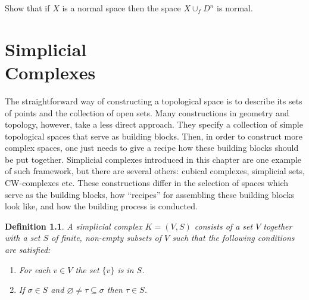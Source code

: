 \documentclass[11pt, letterpaper, oneside]{report}
\renewcommand{\chaptermark}[1]{\markboth{#1}{}}
\theoremstyle{pplain}
\newtheorem{ITERMVALUE THM}[theorem]{Intermediate Value Theorem}
\newtheorem{HEINEBOREL THM}[theorem]{Heine-Borel Theorem}
\newtheorem{UMETR THM}[theorem]{Urysohn Metrization Theorem}
\newtheorem{UMETR2 THM}[theorem]{Urysohn Metrization Theorem (v.2)}
\theoremstyle{ddefinition}
\newtheorem{definition}[theorem]{Definition}
\theoremstyle{nnn}
\newtheorem{TDA NN}[theorem]{Topological Data Analysis. }
\theoremstyle{eexercise}
\newcommand{\benu}{\begin{enumerate}}
\newcommand{\eenu}{\end{enumerate}}
\begin{document}
Show that if $X$ is a normal space then the space $X\cup_{f} D^{n}$ is normal. 







\newpage

\chapter[Simplicial Complexes]{Simplicial\\ Complexes}
\chaptermark{Simplicial Complexes}

\thispagestyle{firststyle}
\label{SIMPLICIAL COMPLEXES CH}


The straightforward way of constructing  a topological space is to describe its sets of points 
and the collection of open sets. Many constructions in geometry and topology, however, take 
a less direct approach. They specify a collection of simple topological spaces that serve as 
building blocks. Then, in order to construct more complex spaces, one just needs to  give a 
recipe how these building blocks should be put together. Simplicial complexes introduced in this 
chapter are one example of such framework, but there are several others: cubical complexes, 
simplicial sets, CW-complexes etc.  These constructions differ in the selection of spaces which
serve as the building blocks, how ``recipes'' for assembling these building blocks look like, and how 
the building process is conducted. 

\begin{definition}
\label{SIMPL COMPLEX DEF}
A \emph{simplicial complex} $K = (V, S)$ consists of a set $V$ together with a set 
$S$ of finite, non-empty subsets of $V$ such that the following conditions are satisfied:
\benu
\item[1)] For each $v\in V$ the set $\{v\}$  is in $S$. 
\item[2)] If $\sigma \in S$ and $\varnothing \neq \tau \subseteq \sigma$ then $\tau \in S$. 
\eenu
\end{definition}
\end{document}
